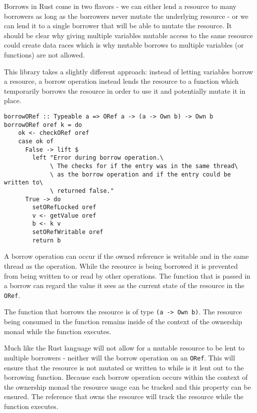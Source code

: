\documentclass[onehalf,11pt]{beavtex}
\begin{document}
Borrows in Rust come in two flavors - we can either lend a resource to many
borrowers as long as the borrowers never mutate the underlying resource - or we
can lend it to a single borrower that will be able to mutate the
resource.\cite{rust_book_borrowing}
It should be clear why giving multiple variables mutable access to
the same resource could create data races which is why mutable borrows to
multiple variables (or functions) are not allowed.

This library takes a slightly different approach: instead of letting variables
borrow a resource, a borrow operation instead lends the resource to a function
which temporarily borrows the resource in order to use it and potentially mutate
it in place.

\begin{verbatim}
borrowORef :: Typeable a => ORef a -> (a -> Own b) -> Own b
borrowORef oref k = do
    ok <- checkORef oref
    case ok of
      False -> lift $
        left "Error during borrow operation.\
             \ The checks for if the entry was in the same thread\
             \ as the borrow operation and if the entry could be written to\
             \ returned false."
      True -> do
        setORefLocked oref
        v <- getValue oref
        b <- k v
        setORefWritable oref
        return b
\end{verbatim}

A borrow operation can occur if the owned reference is writable and
in the same thread as the operation.
While the resource is being borrowed it is prevented from being written to or
read by other operations. The function that is passed in a borrow can regard
the value it sees as the current state of the resource in the \texttt{ORef}.

The function that borrows the resource is of type \texttt{(a -> Own b)}. The
resource being consumed in the function remains inside of the context of the
ownership monad while the function executes. %

Much like the Rust language will not allow for a mutable resource to be lent to
multiple borrowers - neither will the borrow operation on an \texttt{ORef}.
This will ensure that the resource is not mutated or written to while is it lent
out to the borrowing function.
Because each borrow operation occurs within the context of the ownership monad
the resource usage can be tracked and this property can be ensured. The
reference that owns the resource will track the resource while the function
executes.
\end{document}
